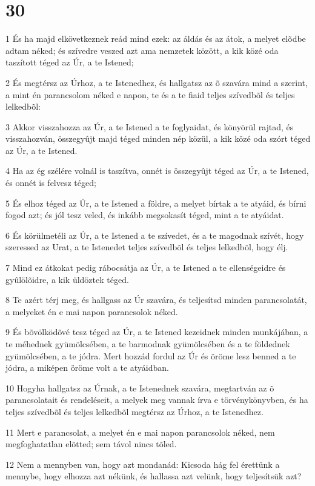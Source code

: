 \chapter{30}

\par 1 És ha majd elkövetkeznek reád mind ezek: az áldás és az átok, a melyet elõdbe adtam néked; és szívedre veszed azt ama nemzetek között, a kik közé oda taszított téged az Úr, a te Istened;
\par 2 És megtérsz az Úrhoz, a te Istenedhez, és hallgatsz az õ szavára mind a szerint, a mint én parancsolom néked e napon, te és a te fiaid teljes szívedbõl és teljes lelkedbõl:
\par 3 Akkor visszahozza az Úr, a te Istened a te foglyaidat, és könyörül rajtad, és visszahozván, összegyûjt majd téged minden  nép közül, a kik közé oda szórt téged az Úr, a te Istened.
\par 4 Ha az ég szélére volnál is taszítva, onnét is összegyûjt téged az Úr, a te Istened, és onnét is felvesz téged;
\par 5 És elhoz téged az Úr, a te Istened a földre, a melyet bírtak a te atyáid, és bírni fogod azt; és jól tesz veled, és inkább megsokasít téged, mint a te atyáidat.
\par 6 És körülmetéli az Úr, a te Istened a te szívedet, és a te magodnak szívét, hogy szeressed az Urat, a te Istenedet teljes szívedbõl és teljes lelkedbõl, hogy élj.
\par 7 Mind ez átkokat pedig rábocsátja az Úr, a te Istened a te ellenségeidre és gyûlölõidre, a kik üldöztek téged.
\par 8 Te azért térj meg, és hallgass az Úr szavára, és teljesítsd minden parancsolatát, a melyeket én e mai napon parancsolok néked.
\par 9 És bõvölködõvé tesz téged az Úr, a te Istened kezeidnek minden munkájában, a te méhednek gyümölcsében, a te barmodnak gyümölcsében és a te földednek gyümölcsében, a te jódra. Mert hozzád fordul az Úr és öröme lesz benned a te jódra, a miképen öröme volt a te atyáidban.
\par 10 Hogyha hallgatsz az Úrnak, a te Istenednek szavára, megtartván az õ parancsolatait és rendeléseit, a melyek meg vannak írva e törvénykönyvben, és ha teljes szívedbõl és teljes lelkedbõl megtérsz az Úrhoz, a te Istenedhez.
\par 11 Mert e parancsolat, a melyet én e mai napon parancsolok néked, nem megfoghatatlan elõtted; sem távol nincs tõled.
\par 12 Nem a mennyben van, hogy azt mondanád: Kicsoda hág fel érettünk a mennybe, hogy elhozza azt nékünk, és hallassa azt velünk, hogy teljesítsük azt?
